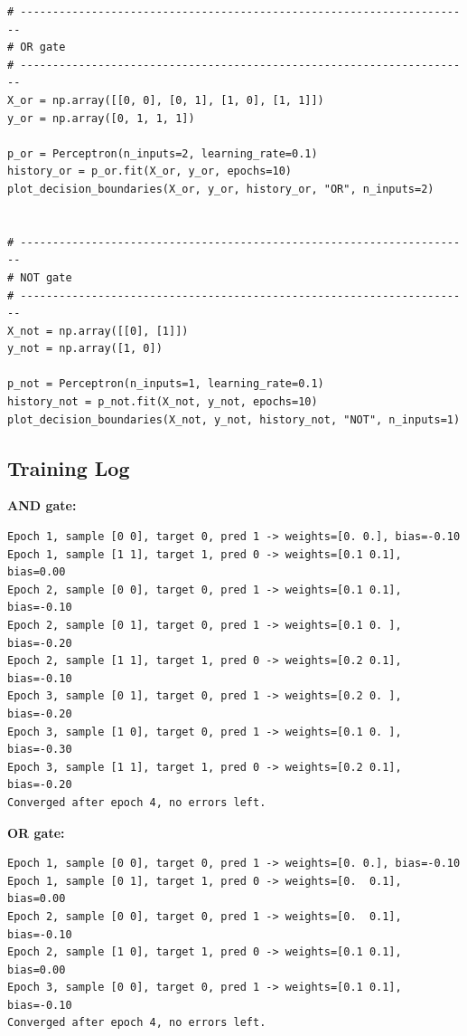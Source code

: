 \begin{verbatim}
# ----------------------------------------------------------------------
# OR gate
# ----------------------------------------------------------------------
X_or = np.array([[0, 0], [0, 1], [1, 0], [1, 1]])
y_or = np.array([0, 1, 1, 1])

p_or = Perceptron(n_inputs=2, learning_rate=0.1)
history_or = p_or.fit(X_or, y_or, epochs=10)
plot_decision_boundaries(X_or, y_or, history_or, "OR", n_inputs=2)


# ----------------------------------------------------------------------
# NOT gate
# ----------------------------------------------------------------------
X_not = np.array([[0], [1]])
y_not = np.array([1, 0])

p_not = Perceptron(n_inputs=1, learning_rate=0.1)
history_not = p_not.fit(X_not, y_not, epochs=10)
plot_decision_boundaries(X_not, y_not, history_not, "NOT", n_inputs=1)
\end{verbatim}

\subsection*{Training Log}

\textbf{AND gate:}
{\scriptsize
\begin{verbatim}
Epoch 1, sample [0 0], target 0, pred 1 -> weights=[0. 0.], bias=-0.10
Epoch 1, sample [1 1], target 1, pred 0 -> weights=[0.1 0.1], bias=0.00
Epoch 2, sample [0 0], target 0, pred 1 -> weights=[0.1 0.1], bias=-0.10
Epoch 2, sample [0 1], target 0, pred 1 -> weights=[0.1 0. ], bias=-0.20
Epoch 2, sample [1 1], target 1, pred 0 -> weights=[0.2 0.1], bias=-0.10
Epoch 3, sample [0 1], target 0, pred 1 -> weights=[0.2 0. ], bias=-0.20
Epoch 3, sample [1 0], target 0, pred 1 -> weights=[0.1 0. ], bias=-0.30
Epoch 3, sample [1 1], target 1, pred 0 -> weights=[0.2 0.1], bias=-0.20
Converged after epoch 4, no errors left.
\end{verbatim}
}

\textbf{OR gate:}
{\scriptsize
\begin{verbatim}
Epoch 1, sample [0 0], target 0, pred 1 -> weights=[0. 0.], bias=-0.10
Epoch 1, sample [0 1], target 1, pred 0 -> weights=[0.  0.1], bias=0.00
Epoch 2, sample [0 0], target 0, pred 1 -> weights=[0.  0.1], bias=-0.10
Epoch 2, sample [1 0], target 1, pred 0 -> weights=[0.1 0.1], bias=0.00
Epoch 3, sample [0 0], target 0, pred 1 -> weights=[0.1 0.1], bias=-0.10
Converged after epoch 4, no errors left.
\end{verbatim}
}

